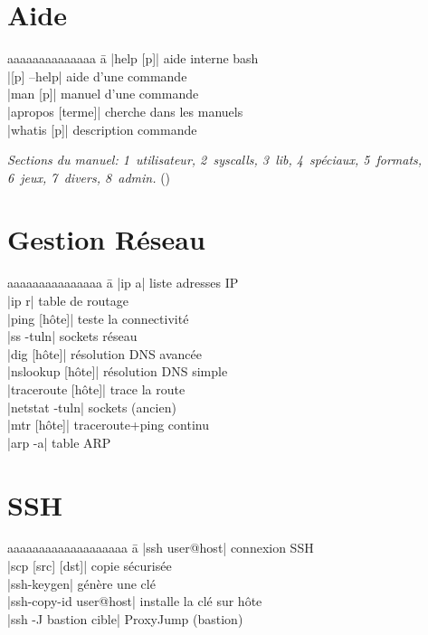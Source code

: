 \documentclass{article}
\begin{document}
\begin{multicols}{4}
    \section*{Aide}
    \begin{tabbing}
        aaaaaaaaaaaaaa \= a \kill
        \code|help [p]| \> aide interne bash \\
        \code|[p] --help| \> aide d'une commande \\
        \code|man [p]| \> manuel d'une commande \\
        \code|apropos [terme]| \> cherche dans les manuels \\
        \code|whatis [p]| \> description commande
    \end{tabbing}

    \emph{Sections du manuel: 1~utilisateur, 2~syscalls, 3~lib, 4~spéciaux, 5~formats, 6~jeux, 7~divers, 8~admin.} ()

    \section*{Gestion Réseau}
    \begin{tabbing}
        aaaaaaaaaaaaaaa \= a \kill
        \code|ip a| \> liste adresses IP \\
        \code|ip r| \> table de routage \\
        \code|ping [hôte]| \> teste la connectivité \\
        \code|ss -tuln| \> sockets réseau \\
        \code|dig [hôte]| \> résolution DNS avancée \\
        \code|nslookup [hôte]| \> résolution DNS simple \\
        \code|traceroute [hôte]| \> trace la route \\
        \code|netstat -tuln| \> sockets (ancien) \\
        \code|mtr [hôte]| \> traceroute+ping continu \\
        \code|arp -a| \> table ARP
    \end{tabbing}

    \section*{SSH}
    \begin{tabbing}
        aaaaaaaaaaaaaaaaaaa \= a \kill
        \code|ssh user@host| \> connexion SSH \\
        \code|scp [src] [dst]| \> copie sécurisée \\
        \code|ssh-keygen| \> génère une clé \\
        \code|ssh-copy-id user@host| \> installe la clé sur hôte \\
        \code|ssh -J bastion cible| \> ProxyJump (bastion) \\
    \end{tabbing}


\end{multicols}
\end{document}
